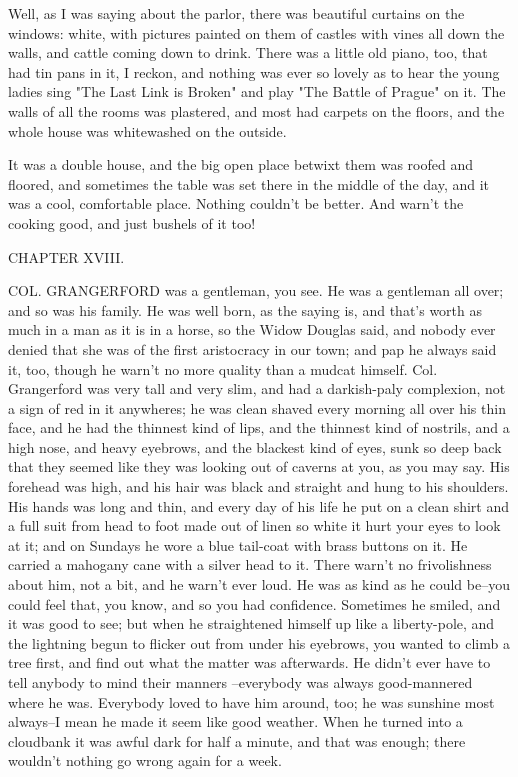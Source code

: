 Well, as I was saying about the parlor, there was beautiful curtains on
the windows:  white, with pictures painted on them of castles with vines
all down the walls, and cattle coming down to drink.  There was a little
old piano, too, that had tin pans in it, I reckon, and nothing was ever
so lovely as to hear the young ladies sing "The Last Link is Broken" and
play "The Battle of Prague" on it.  The walls of all the rooms was
plastered, and most had carpets on the floors, and the whole house was
whitewashed on the outside.

It was a double house, and the big open place betwixt them was roofed and
floored, and sometimes the table was set there in the middle of the day,
and it was a cool, comfortable place.  Nothing couldn't be better.  And
warn't the cooking good, and just bushels of it too!




CHAPTER XVIII.

COL.  GRANGERFORD was a gentleman, you see.  He was a gentleman all over;
and so was his family.  He was well born, as the saying is, and that's
worth as much in a man as it is in a horse, so the Widow Douglas said,
and nobody ever denied that she was of the first aristocracy in our town;
and pap he always said it, too, though he warn't no more quality than a
mudcat himself.  Col.  Grangerford was very tall and very slim, and had a
darkish-paly complexion, not a sign of red in it anywheres; he was clean
shaved every morning all over his thin face, and he had the thinnest kind
of lips, and the thinnest kind of nostrils, and a high nose, and heavy
eyebrows, and the blackest kind of eyes, sunk so deep back that they
seemed like they was looking out of caverns at you, as you may say.  His
forehead was high, and his hair was black and straight and hung to his
shoulders. His hands was long and thin, and every day of his life he put
on a clean shirt and a full suit from head to foot made out of linen so
white it hurt your eyes to look at it; and on Sundays he wore a blue
tail-coat with brass buttons on it.  He carried a mahogany cane with a
silver head to it.  There warn't no frivolishness about him, not a bit,
and he warn't ever loud.  He was as kind as he could be--you could feel
that, you know, and so you had confidence.  Sometimes he smiled, and it
was good to see; but when he straightened himself up like a liberty-pole,
and the lightning begun to flicker out from under his eyebrows, you
wanted to climb a tree first, and find out what the matter was
afterwards.  He didn't ever have to tell anybody to mind their manners
--everybody was always good-mannered where he was.  Everybody loved to have
him around, too; he was sunshine most always--I mean he made it seem
like good weather.  When he turned into a cloudbank it was awful dark for
half a minute, and that was enough; there wouldn't nothing go wrong again
for a week.

